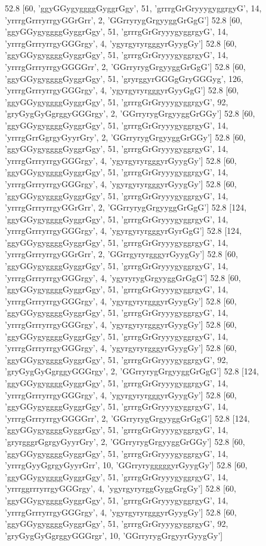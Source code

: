 52.8 [60, 'ggyGGygyggggGyggrGgy', 51, 'grrrgGrGryyygyggrgyG', 14, 'yrrrgGrrryrrgyGGrGrr', 2, 'GGrryrygGrgyyggGrGgG']
52.8 [60, 'ggyGGygyggggGyggrGgy', 51, 'grrrgGrGryyygyggrgyG', 14, 'yrrrgGrrryrrgyGGGrgy', 4, 'ygyrgyryrgggyrGyygGy']
52.8 [60, 'ggyGGygyggggGyggrGgy', 51, 'grrrgGrGryyygyggrgyG', 14, 'yrrrgGrrryrrgyGGGGrr', 2, 'GGrryrygGrgyyggGrGgG']
52.8 [60, 'ggyGGygyggggGyggrGgy', 51, 'gryrggyrGGGgGryGGGyg', 126, 'yrrrgGrrryrrgyGGGrgy', 4, 'ygyrgyryrgggyrGyyGgG']
52.8 [60, 'ggyGGygyggggGyggrGgy', 51, 'grrrgGrGryyygyggrgyG', 92, 'gryGygGyGgrggyGGGrgy', 2, 'GGrryrygGrgyyggGrGGy']
52.8 [60, 'ggyGGygyggggGyggrGgy', 51, 'grrrgGrGryyygyggrgyG', 14, 'yrrrgGrrGgrgyGyyrGry', 2, 'GGrryrygGrgyyggGrGGy']
52.8 [60, 'ggyGGygyggggGyggrGgy', 51, 'grrrgGrGryyygyggrgyG', 14, 'yrrrgGrrryrrgyGGGrgy', 4, 'ygyrgyryrgggyrGyygGy']
52.8 [60, 'ggyGGygyggggGyggrGgy', 51, 'grrrgGrGryyygyggrgyG', 14, 'yrrrgGrrryrrgyGGGrgy', 4, 'ygyrgyryrgggyrGyygGy']
52.8 [60, 'ggyGGygyggggGyggrGgy', 51, 'grrrgGrGryyygyggrgyG', 14, 'yrrrgGrrryrrgyGGrGrr', 2, 'GGrryrygGrgyyggGrGgG']
52.8 [124, 'ggyGGygyggggGyggrGgy', 51, 'grrrgGrGryyygyggrgyG', 14, 'yrrrgGrrryrrgyGGGrgy', 4, 'ygyrgyryrgggyrGyrGgG']
52.8 [124, 'ggyGGygyggggGyggrGgy', 51, 'grrrgGrGryyygyggrgyG', 14, 'yrrrgGrrryrrgyGGrGrr', 2, 'GGrrgyryrgggyrGyygGy']
52.8 [60, 'ggyGGygyggggGyggrGgy', 51, 'grrrgGrGryyygyggrgyG', 14, 'yrrrgGrrryrrgyGGGrgy', 4, 'ygyryrygGrgyyggGrGgG']
52.8 [60, 'ggyGGygyggggGyggrGgy', 51, 'grrrgGrGryyygyggrgyG', 14, 'yrrrgGrrryrrgyGGGrgy', 4, 'ygyrgyryrgggyrGyygGy']
52.8 [60, 'ggyGGygyggggGyggrGgy', 51, 'grrrgGrGryyygyggrgyG', 14, 'yrrrgGrrryrrgyGGGrgy', 4, 'ygyrgyryrgggyrGyygGy']
52.8 [60, 'ggyGGygyggggGyggrGgy', 51, 'grrrgGrGryyygyggrgyG', 14, 'yrrrgGrrryrrgyGGGrgy', 4, 'ygyrgyryrgggyrGyygGy']
52.8 [60, 'ggyGGygyggggGyggrGgy', 51, 'grrrgGrGryyygyggrgyG', 92, 'gryGygGyGgrggyGGGrgy', 2, 'GGrryrygGrgyyggGrGgG']
52.8 [124, 'ggyGGygyggggGyggrGgy', 51, 'grrrgGrGryyygyggrgyG', 14, 'yrrrgGrrryrrgyGGGrgy', 4, 'ygyrgyryrgggyrGyygGy']
52.8 [60, 'ggyGGygyggggGyggrGgy', 51, 'grrrgGrGryyygyggrgyG', 14, 'yrrrgGrrryrrgyGGGGrr', 2, 'GGrryrygGrgyyggGrGgG']
52.8 [124, 'ggyGGygyggggGyggrGgy', 51, 'grrrgGrGryyygyggrgyG', 14, 'gryrgggrGgrgyGyyrGry', 2, 'GGrryrygGrgyyggGrGGy']
52.8 [60, 'ggyGGygyggggGyggrGgy', 51, 'grrrgGrGryyygyggrgyG', 14, 'yrrrgGyyGgrgyGyyrGrr', 10, 'GGrryrygggggyrGyygGy']
52.8 [60, 'ggyGGygyggggGyggrGgy', 51, 'grrrgGrGryyygyggrgyG', 14, 'yrrrggrrryrrgyGGGrgy', 4, 'ygyrgyryrggGyggGrgGy']
52.8 [60, 'ggyGGygyggggGyggrGgy', 51, 'grrrgGrGryyygyggrgyG', 14, 'yrrrgGrrryrrgyGGGrgy', 4, 'ygyrgyryrgggyrGyygGy']
52.8 [60, 'ggyGGygyggggGyggrGgy', 51, 'grrrgGrGryyygyggrgyG', 92, 'gryGygGyGgrggyGGGrgr', 10, 'GGrryrygGrgyyrGyygGy']
